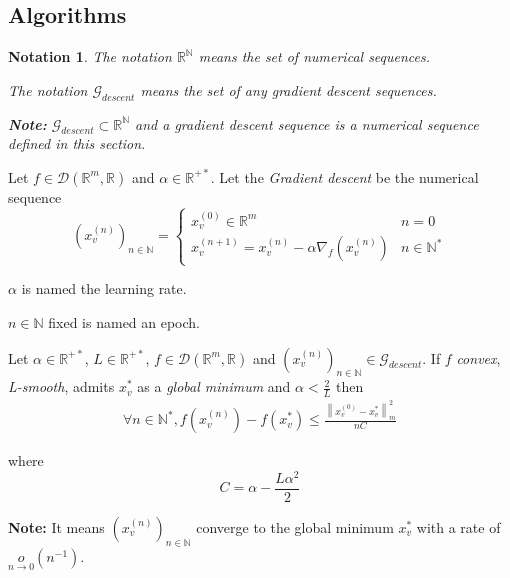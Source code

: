 \documentclass[11pt,en]{elegantpaper}
\newtheorem{notation}{Notation}
\newcommand{\norm}[1]{\left\lVert#1\right\rVert}
\newcommand{\Real}{\mathbb{R}}
\begin{document}
\subsection{Algorithms}

\begin{notation}
  The notation $\Real^{\mathbb{N}}$ means the set of numerical sequences. \par
  The notation $\mathcal{G}_{descent}$ means the set of any gradient descent sequences. \par
  \textbf{Note:} $\mathcal{G}_{descent} \subset \Real^{\mathbb{N}}$ and a gradient descent sequence is a
  numerical sequence defined in this section.
\end{notation}

\begin{definition}
  Let $f \in \mathcal{D}(\Real^m,\Real)$ and $\alpha \in \Real^{+*}$. Let the \textit{Gradient descent}
  be the numerical sequence \begin{equation}\label{def:vanilla_grad_descent}
    (x_v^{(n)})_{n \in \mathbb{N}} = \left\{
      \begin{array}{ll}
        x_v^{(0)} \in \Real^m & n = 0 \\
        x_v^{(n+1)} = x_v^{(n)} - \alpha \nabla_f(x_v^{(n)}) & n \in \mathbb{N}^*
      \end{array}
    \right.
  \end{equation} \par

  $\alpha$ is named the learning rate. \par
  $n \in \mathbb{N}$ fixed is named an epoch.
\end{definition}

\begin{proposition}
  {\normalfont
    Let $\alpha \in \Real^{+*}$, $L \in \Real^{+*}$, $f \in \mathcal{D}(\Real^m,\Real)$ and $(x_v^{(n)})_{n \in \mathbb{N}} \in \mathcal{G}_{descent}$.
    If $f$ \textit{convex}, \textit{L-smooth}, admits $x_v^*$ as a \textit{global minimum} and $\alpha < \frac{2}{L}$ then \begin{equation*}
      \begin{gathered}
        \forall n \in \mathbb{N}^*, f(x_v^{(n)}) - f(x_v^*) \leq \frac{\norm{x_v^{(0)} - x_v^*}^2_m}{nC}
      \end{gathered}
    \end{equation*} \par where \begin{equation*}
      C = \alpha - \frac{L\alpha^2}{2}
    \end{equation*}
  
    \textbf{Note:} It means $(x_v^{(n)})_{n \in \mathbb{N}}$ converge to the global minimum $x_v^*$ with a rate of $\underset{n \to 0}{o}(n^{-1})$.
  }
\end{proposition}
\end{document}
